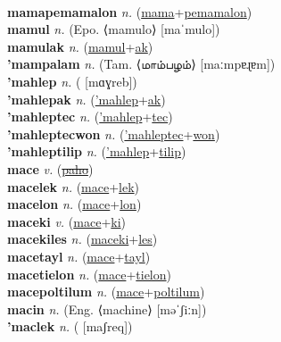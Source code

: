  \label{mamatapalon} \\
\textbf{mamapemamalon} \textit{n.} (\hyperref[mama]{mama}+\hyperref[pemamalon]{pemamalon})
 \label{mamapemamalon} \\
\textbf{mamul} \textit{n.} (Epo. ⟨mamulo⟩ [maˈmulo])
 \label{mamul} \\
\textbf{mamulak} \textit{n.} (\hyperref[mamul]{mamul}+\hyperref[ak]{ak})
 \label{mamulak} \\
\textbf{'mampalam} \textit{n.} (Tam. ⟨மாம்பழம்⟩ [maːmpɐɻɐm])
 \label{'mampalam} \\
\textbf{'mahlep} \textit{n.} ( [mɑɣreb])
 \label{'mahlep} \\
\textbf{'mahlepak} \textit{n.} (\hyperref['mahlep]{'mahlep}+\hyperref[ak]{ak})
 \label{'mahlepak} \\
\textbf{'mahleptec} \textit{n.} (\hyperref['mahlep]{'mahlep}+\hyperref[tec]{tec})
 \label{'mahleptec} \\
\textbf{'mahleptecwon} \textit{n.} (\hyperref['mahleptec]{'mahleptec}+\hyperref[won]{won})
 \label{'mahleptecwon} \\
\textbf{'mahleptilip} \textit{n.} (\hyperref['mahlep]{'mahlep}+\hyperref[tilip]{tilip})
 \label{'mahleptilip} \\
\textbf{mace} \textit{v.} (\hyperref[paho]{\sout{paho}})
 \label{mace} \\
\textbf{macelek} \textit{n.} (\hyperref[mace]{mace}+\hyperref[lek]{lek})
 \label{macelek} \\
\textbf{macelon} \textit{n.} (\hyperref[mace]{mace}+\hyperref[lon]{lon})
 \label{macelon} \\
\textbf{maceki} \textit{v.} (\hyperref[mace]{mace}+\hyperref[ki]{ki})
 \label{maceki} \\
\textbf{macekiles} \textit{n.} (\hyperref[maceki]{maceki}+\hyperref[les]{les})
 \label{macekiles} \\
\textbf{macetayl} \textit{n.} (\hyperref[mace]{mace}+\hyperref[tayl]{tayl})
 \label{macetayl} \\
\textbf{macetielon} \textit{n.} (\hyperref[mace]{mace}+\hyperref[tielon]{tielon})
 \label{macetielon} \\
\textbf{macepoltilum} \textit{n.} (\hyperref[mace]{mace}+\hyperref[poltilum]{poltilum})
 \label{macepoltilum} \\
\textbf{macin} \textit{n.} (Eng. ⟨machine⟩ [məˈʃiːn])
 \label{macin} \\
\textbf{'maclek} \textit{n.} ( [maʃreq])
 \label{'maclek} \\

